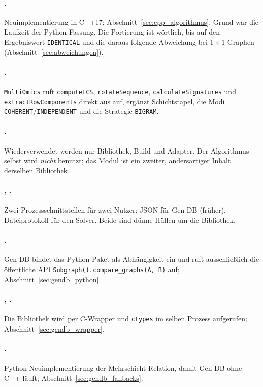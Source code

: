\paragraph{.} Neuimplementierung in C++17; Abschnitt~\ref{sec:cpp_algorithmus}. Grund war die Laufzeit der Python-Fassung. Die Portierung ist wörtlich, bis auf den Ergebniswert \texttt{IDENTICAL} und die daraus folgende Abweichung bei $1\times1$-Graphen (Abschnitt~\ref{sec:abweichungen}).

\paragraph{.} \texttt{MultiOmics} ruft \texttt{computeLCS}, \texttt{rotateSequence}, \texttt{calculateSignatures} und \texttt{extractRowComponents} direkt aus  auf, ergänzt Schichtstapel, die Modi \texttt{COHERENT}/\texttt{INDEPENDENT} und die Strategie \texttt{BIGRAM}.

\paragraph{.} Wiederverwendet werden nur Bibliothek, Build und Adapter. Der Algorithmus selbst wird \emph{nicht} benutzt; das Modul ist ein zweiter, andersartiger Inhalt derselben Bibliothek.

\paragraph{, .} Zwei Prozessschnittstellen für zwei Nutzer: JSON für Gen-DB (früher), Dateiprotokoll für den Solver. Beide sind dünne Hüllen um die Bibliothek.

\paragraph{.} Gen-DB bindet das Python-Paket als Abhängigkeit ein und ruft ausschließlich die öffentliche API \texttt{Subgraph().compare\_graphs(A, B)} auf; Abschnitt~\ref{sec:gendb_python}.

\paragraph{, .} Die Bibliothek wird per C-Wrapper und \texttt{ctypes} im selben Prozess aufgerufen; Abschnitt~\ref{sec:gendb_wrapper}.

\paragraph{.} Python-Neuimplementierung der Mehrschicht-Relation, damit Gen-DB ohne C++ läuft; Abschnitt~\ref{sec:gendb_fallbacks}.


